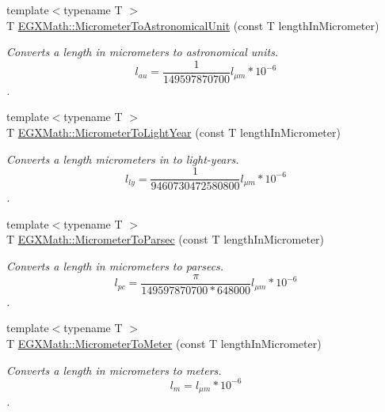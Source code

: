 \begin{DoxyCompactItemize}
\item 
{\footnotesize template$<$typename T $>$ }\\T \mbox{\hyperlink{group___e_g_x_math-_conversions-_length_conversions-_s_i-_micrometer-_astronomical_ga910b8baeb25ec569394e5563afebc70f}{E\+G\+X\+Math\+::\+Micrometer\+To\+Astronomical\+Unit}} (const T length\+In\+Micrometer)
\begin{DoxyCompactList}\small\item\em Converts a length in micrometers to astronomical units. \[ l_{au}= \frac{1}{149597870700} l_{\mu m} * 10^{-6} \]. \end{DoxyCompactList}\item 
{\footnotesize template$<$typename T $>$ }\\T \mbox{\hyperlink{group___e_g_x_math-_conversions-_length_conversions-_s_i-_micrometer-_astronomical_ga17ce0795cd099de3fd453a455f0a2260}{E\+G\+X\+Math\+::\+Micrometer\+To\+Light\+Year}} (const T length\+In\+Micrometer)
\begin{DoxyCompactList}\small\item\em Converts a length micrometers in to light-\/years. \[ l_{ly}= \frac{1}{9460730472580800} l_{\mu m} * 10^{-6} \]. \end{DoxyCompactList}\item 
{\footnotesize template$<$typename T $>$ }\\T \mbox{\hyperlink{group___e_g_x_math-_conversions-_length_conversions-_s_i-_micrometer-_astronomical_gab7d1e9a1568a8691855121c9cf2b38f5}{E\+G\+X\+Math\+::\+Micrometer\+To\+Parsec}} (const T length\+In\+Micrometer)
\begin{DoxyCompactList}\small\item\em Converts a length in micrometers to parsecs. \[ l_{pc}=\frac{\pi}{149597870700 * 648000} l_{\mu m} * 10^{-6} \]. \end{DoxyCompactList}\item 
{\footnotesize template$<$typename T $>$ }\\T \mbox{\hyperlink{group___e_g_x_math-_conversions-_length_conversions-_s_i-_micrometer-_s_i_ga20cc456329c53dfb121348e03e8b282d}{E\+G\+X\+Math\+::\+Micrometer\+To\+Meter}} (const T length\+In\+Micrometer)
\begin{DoxyCompactList}\small\item\em Converts a length in micrometers to meters. \[ l_{m}=l_{\mu m} * 10^{-6}\]. \end{DoxyCompactList}\item 

\end{DoxyCompactItemize}
